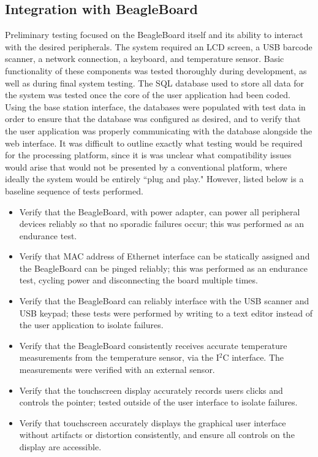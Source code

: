 \documentclass[11pt]{article} %
\begin{document}
\subsection{Integration with BeagleBoard}
Preliminary testing focused on the BeagleBoard itself and its ability to interact with the desired peripherals.  The system required an LCD screen, a USB barcode scanner, a network connection, a keyboard, and temperature sensor.  Basic functionality of these components was tested thoroughly during development, as well as during final system testing. 
\newline \quad \newline
The SQL database used to store all data for the system was tested once the core of the user application had been coded.  Using the base station interface, the databases were populated with test data in order to ensure that the database was configured as desired, and to verify that the user application was properly communicating with the database alongside the web interface.
\newline \quad \newline
It was difficult to outline exactly what testing would be required for the processing platform, since it is was unclear what compatibility issues would arise that would not be presented by a conventional platform, where ideally the system would be entirely ``plug and play." However, listed below is a baseline sequence of tests performed.
\begin{itemize}
\item Verify that the BeagleBoard, with power adapter, can power all peripheral devices reliably so that no sporadic failures occur; this was performed as an endurance test.
\item Verify that MAC address of Ethernet interface can be statically assigned and the BeagleBoard can be pinged reliably; this was performed as an endurance test, cycling power and disconnecting the board multiple times.
\item Verify that the BeagleBoard can reliably interface with the USB scanner and USB keypad; these tests were performed by writing to a text editor instead of the user application to isolate failures.
\item Verify that the BeagleBoard consistently receives accurate temperature measurements from the temperature sensor, via the I$^2$C interface. The measurements were verified with an external sensor.
\item Verify that the touchscreen display accurately records users clicks and controls the pointer; tested outside of the user interface to isolate failures.
\item Verify that touchscreen accurately displays the graphical user interface without artifacts or distortion consistently, and ensure all controls on the display are accessible.
\end{itemize}
\end{document}
